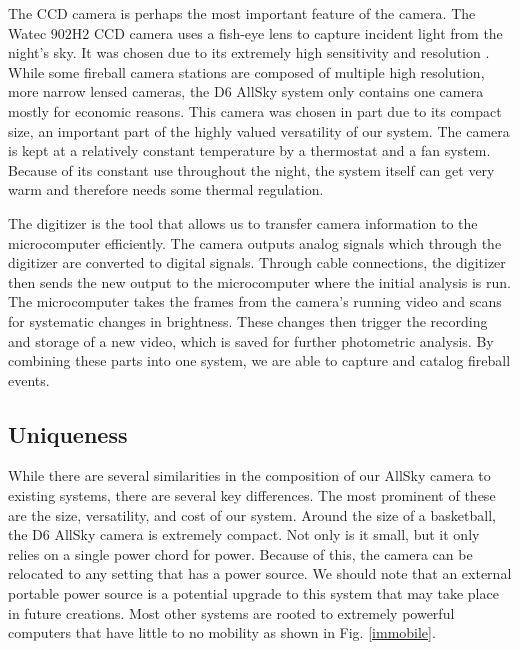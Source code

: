 The CCD camera is perhaps the most important feature of the camera.  
The Watec $902$H$2$ CCD camera uses a fish-eye lens to capture incident light from the night's sky.  
It was chosen due to its extremely high sensitivity and resolution \cite{mcswain_using_2016}.
While some fireball camera stations are composed of multiple high resolution, more narrow lensed cameras, the D6 AllSky system only contains one camera mostly for economic reasons.  
This camera was chosen in part due to its compact size, an important part of the highly valued versatility of our system. 
The camera is kept at a relatively constant temperature by a thermostat and a fan system. 
Because of its constant use throughout the night, the system itself can get very warm and therefore needs some thermal regulation.

The digitizer is the tool that allows us to transfer camera information to the microcomputer efficiently.  
The camera outputs analog signals which through the digitizer are converted to digital signals.
Through cable connections, the digitizer then sends the new output to the microcomputer where the initial analysis is run. 
The microcomputer takes the frames from the camera's running video and scans for systematic changes in brightness.
These changes then trigger the recording and storage of a new video, which is saved for further photometric analysis.
By combining these parts into one system, we are able to capture and catalog fireball events.

\subsection{Uniqueness}

While there are several similarities in the composition of our AllSky camera to existing systems, there are several key differences.
The most prominent of these are the size, versatility, and cost of our system.
Around the size of a basketball, the D6 AllSky camera is extremely compact.  
Not only is it small, but it only relies on a single power chord for power.  
Because of this, the camera can be relocated to any setting that has a power source.  
We should note that an external portable power source is a potential upgrade to this system that may take place in future creations.
Most other systems are rooted to extremely powerful computers that have little to no mobility as shown in Fig. \ref{immobile}.

